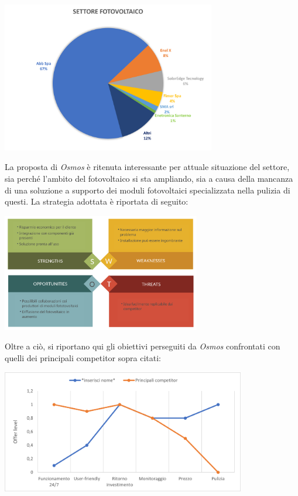\documentclass[a4paper, 12pt]{article}
\begin{document}
	\begin{center}
		\includegraphics[width=0.7\textwidth]{Images/suddivisione_settore.png}
	\end{center}
	La proposta di \emph{Osmos} è ritenuta interessante per attuale situazione del settore, sia perché l'ambito del fotovoltaico si sta ampliando, sia a causa della mancanza di una soluzione a supporto dei moduli fotovoltaici specializzata nella pulizia di questi. La strategia adottata è riportata di seguito:
	\begin{center}
		\includegraphics[width=0.65\textwidth]{Images/SWOT2.png}%
	\end{center}
	Oltre a ciò, si riportano qui gli obiettivi perseguiti da \emph{Osmos} confrontati con quelli dei principali competitor sopra citati:
	\begin{center}
		\includegraphics[width=0.8\textwidth]{Images/curve_valore.png}%
	\end{center}
\end{document}
